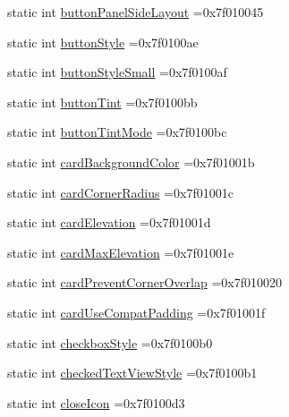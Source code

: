 \begin{DoxyCompactItemize}
static int \hyperlink{classandroid_1_1support_1_1v7_1_1mediarouter_1_1R_1_1attr_a2be1cd23c0ba57efce6daa640927dc7b}{button\+Panel\+Side\+Layout} =0x7f010045
\item 
static int \hyperlink{classandroid_1_1support_1_1v7_1_1mediarouter_1_1R_1_1attr_a3104a420f7d9779d4be5ae4155378c1e}{button\+Style} =0x7f0100ae
\item 
static int \hyperlink{classandroid_1_1support_1_1v7_1_1mediarouter_1_1R_1_1attr_ae5673ab51625b9587786678823cd5110}{button\+Style\+Small} =0x7f0100af
\item 
static int \hyperlink{classandroid_1_1support_1_1v7_1_1mediarouter_1_1R_1_1attr_a7a0864e38dac2a7dab7d5eb405509714}{button\+Tint} =0x7f0100bb
\item 
static int \hyperlink{classandroid_1_1support_1_1v7_1_1mediarouter_1_1R_1_1attr_a329e426e78f4dea5ee1c3caca9bd8629}{button\+Tint\+Mode} =0x7f0100bc
\item 
static int \hyperlink{classandroid_1_1support_1_1v7_1_1mediarouter_1_1R_1_1attr_a03e2dd68efbbc61b11e0d2c98f2c95ab}{card\+Background\+Color} =0x7f01001b
\item 
static int \hyperlink{classandroid_1_1support_1_1v7_1_1mediarouter_1_1R_1_1attr_a3789fe824c1a499701cd9905dd1671de}{card\+Corner\+Radius} =0x7f01001c
\item 
static int \hyperlink{classandroid_1_1support_1_1v7_1_1mediarouter_1_1R_1_1attr_a4a3eb8639f587203282b0890b75e5057}{card\+Elevation} =0x7f01001d
\item 
static int \hyperlink{classandroid_1_1support_1_1v7_1_1mediarouter_1_1R_1_1attr_a261321b379e1a19092487ee349c07fe5}{card\+Max\+Elevation} =0x7f01001e
\item 
static int \hyperlink{classandroid_1_1support_1_1v7_1_1mediarouter_1_1R_1_1attr_a0cda2b5a90fa880c0f5aee355536576b}{card\+Prevent\+Corner\+Overlap} =0x7f010020
\item 
static int \hyperlink{classandroid_1_1support_1_1v7_1_1mediarouter_1_1R_1_1attr_ad80309d0db49d779271fad3c274a8e88}{card\+Use\+Compat\+Padding} =0x7f01001f
\item 
static int \hyperlink{classandroid_1_1support_1_1v7_1_1mediarouter_1_1R_1_1attr_ae70108ea769d69866d5beea190485fb3}{checkbox\+Style} =0x7f0100b0
\item 
static int \hyperlink{classandroid_1_1support_1_1v7_1_1mediarouter_1_1R_1_1attr_a81e21989621264b9fcc0a28388fa3fa2}{checked\+Text\+View\+Style} =0x7f0100b1
\item 
static int \hyperlink{classandroid_1_1support_1_1v7_1_1mediarouter_1_1R_1_1attr_a76b39c93a184c1a2483ee9999d1613db}{close\+Icon} =0x7f0100d3

\end{DoxyCompactItemize}
